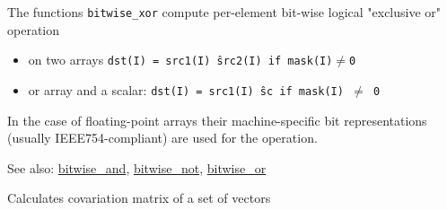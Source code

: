 The functions \texttt{bitwise\_xor} compute per-element bit-wise logical "exclusive or" operation

\begin{itemize}
    \item on two arrays
    \texttt{dst(I) = src1(I) \^ src2(I) if mask(I)$\ne$0}
    \item or array and a scalar:
    \texttt{dst(I) = src1(I) \^ sc if mask(I) $\ne$ 0}
\end{itemize}

In the case of floating-point arrays their machine-specific bit representations (usually IEEE754-compliant) are used for the operation.

See also: \href{bitwise.and}{bitwise\_and}, \href{bitwise.not}{bitwise\_not}, \href{bitwise.or}{bitwise\_or}

\label{calcCovarMatrix}
Calculates covariation matrix of a set of vectors

